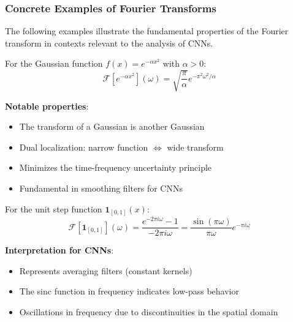 \subsubsection{Concrete Examples of Fourier Transforms}

The following examples illustrate the fundamental properties of the Fourier transform in contexts relevant to the analysis of CNNs.

\begin{example}\label{ex:fourier_gaussian}
For the Gaussian function $f(x) = e^{-\alpha x^2}$ with $\alpha > 0$:
\begin{equation}
\mathcal{F}[e^{-\alpha x^2}](\omega) = \sqrt{\frac{\pi}{\alpha}} e^{-\pi^2 \omega^2/\alpha}
\end{equation}

\textbf{Notable properties}:
\begin{itemize}
    \item The transform of a Gaussian is another Gaussian
    \item Dual localization: narrow function $\Leftrightarrow$ wide transform
    \item Minimizes the time-frequency uncertainty principle
    \item Fundamental in smoothing filters for CNNs
\end{itemize}
\end{example}

\begin{example}\label{ex:fourier_step}
For the unit step function $\mathbf{1}_{[0,1]}(x)$:
\begin{equation}
\mathcal{F}[\mathbf{1}_{[0,1]}](\omega) = \frac{e^{-2\pi i \omega} - 1}{-2\pi i \omega} = \frac{\sin(\pi\omega)}{\pi\omega} e^{-\pi i \omega}
\end{equation}

\textbf{Interpretation for CNNs}:
\begin{itemize}
    \item Represents averaging filters (constant kernels)
    \item The sinc function in frequency indicates low-pass behavior
    \item Oscillations in frequency due to discontinuities in the spatial domain
\end{itemize}
\end{example}

